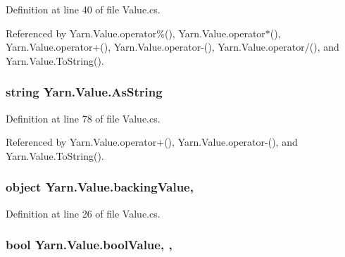 Definition at line 40 of file Value.\-cs.



Referenced by Yarn.\-Value.\-operator\%(), Yarn.\-Value.\-operator$\ast$(), Yarn.\-Value.\-operator+(), Yarn.\-Value.\-operator-\/(), Yarn.\-Value.\-operator/(), and Yarn.\-Value.\-To\-String().

\hypertarget{a00181_a2d5d0ec41c50c642c1d0eeeb6bb2b1c0}{
\subsubsection[{As\-String}]{\setlength{\rightskip}{0pt plus 5cm}string Yarn.\-Value.\-As\-String\hspace{0.3cm}{\ttfamily [get]}}}\label{a00181_a2d5d0ec41c50c642c1d0eeeb6bb2b1c0}


Definition at line 78 of file Value.\-cs.



Referenced by Yarn.\-Value.\-operator+(), Yarn.\-Value.\-operator-\/(), and Yarn.\-Value.\-To\-String().

\hypertarget{a00181_a051dd30c6cb184f1fe941a95be8781ab}{
\subsubsection[{backing\-Value}]{\setlength{\rightskip}{0pt plus 5cm}object Yarn.\-Value.\-backing\-Value\hspace{0.3cm}{\ttfamily [get]}, {\ttfamily [private]}}}\label{a00181_a051dd30c6cb184f1fe941a95be8781ab}


Definition at line 26 of file Value.\-cs.

\hypertarget{a00181_acb140e3466e132528409d4c441fd67da}{
\subsubsection[{bool\-Value}]{\setlength{\rightskip}{0pt plus 5cm}bool Yarn.\-Value.\-bool\-Value\hspace{0.3cm}{\ttfamily [get]}, {\ttfamily [set]}, {\ttfamily [package]}}}\label{a00181_acb140e3466e132528409d4c441fd67da}


